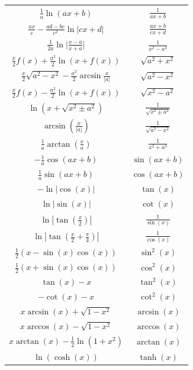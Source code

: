 \begin{center}
\begin{tabular}{c||c}
                $ \frac{1}{a} \ln (ax+b) $  &  $ \frac{1}{ax+b}$ \\
                $ \frac{ax}{c}-\frac{ad-bc}{c^2} \ln |cx+d| $  &  $ \frac{ax+b}{cx+d} $ \\
                $ \frac{1}{2a} \ln { \big| \frac{x-a}{x+a} \big| } $  &  $ \frac{1}{x^2-a^2} $ \\
                $ \frac{x}{2} f(x) + \frac{a^2}{2} \ln ( x+f(x) ) $  &  $ \sqrt{a^2+x^2} $ \\
                $ \frac{x}{2} \sqrt{a^2-x^2} - \frac{a^2}{2} \arcsin \frac{x}{|a|} $  &  $ \sqrt{a^2-x^2} $ \\
                $ \frac{x}{2} f(x) - \frac{a^2}{2} \ln {( x+f(x) )} $  &  $ \sqrt{x^2-a^2} $ \\
                $ \ln(x+\sqrt{x^2 \pm a^2}) $  &  $ \frac{1}{\sqrt{x^2 \pm  a^2}} $ \\
                $ \arcsin( \frac{x}{|a|}) $  &  $ \frac{1}{\sqrt{a^2-x^2}} $ \\
                $ \frac{1}{a} \arctan(\frac{x}{a}) $  &  $ \frac{1}{x^2+a^2} $ \\
                $ -\frac{1}{a}\cos(ax+b) $  &  $ \sin(ax+b) $ \\
                $ \frac{1}{a}\sin(ax+b) $  &  $ \cos(ax+b) $ \\
                $ -\ln|\cos(x)| $  &  $ \tan(x) $ \\
                $ \ln |\sin(x)| $  &  $ \cot(x) $ \\
                $ \ln \left|\tan(\frac{x}{2})\right| $  &  $ \frac{1}{\sin(x)} $ \\
                $ \ln \left|\tan(\frac{x}{2}+\frac{\pi}{4})\right| $  &  $ \frac{1}{\cos(x)} $ \\
                $ \frac{1}{2} (x-\sin(x)\cos(x)) $  &  $ \sin^2(x) $ \\
                $ \frac{1}{2} (x+\sin(x)\cos(x)) $  &  $ \cos^2(x) $ \\
                $ \tan(x)-x $  &  $ \tan^2(x) $ \\
                $ -\cot(x)-x $  &  $ \cot^2(x) $ \\
                $ x \arcsin(x) + \sqrt{1-x^2} $  &  $ \arcsin(x) $ \\
                $ x \arccos(x) - \sqrt{1-x^2} $  &  $ \arccos(x) $ \\
                $ x \arctan(x) - \frac{1}{2} \ln (1+x^2) $  &  $ \arctan(x) $ \\
                $ \ln(\cosh(x)) $  &  $ \tanh(x) $ \\

\end{tabular}
\end{center}
